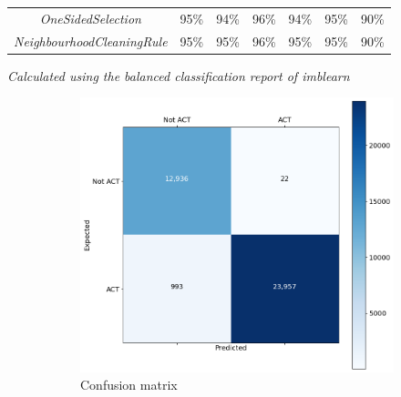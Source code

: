 \begin{table}[H]
\begin{tabular}{@{}ccccccc@{}}
		\textit{OneSidedSelection}               & 95\%               & 94\%            & 96\%                 & 94\%              & 95\%               & 90\%          \\
		\textit{NeighbourhoodCleaningRule}       & 95\%               & 95\%            & 96\%                 & 95\%              & 95\%               & 90\%          \\ \bottomrule
	\end{tabular}
	\textit{Calculated using the balanced classification report of \textit{imblearn} \cite{imblearn}}
\end{table}

\begin{figure}[H]
	\begin{subfigure}{\textwidth}
		\centering
		\includegraphics[scale=0.3]{./src/actAlerts/actalerts_adasyn_cm.png}
		\caption{Confusion matrix}\label{}
	\end{subfigure}\\
	\begin{subfigure}{.5\textwidth}
		\centering

\end{subfigure}
\end{figure}
